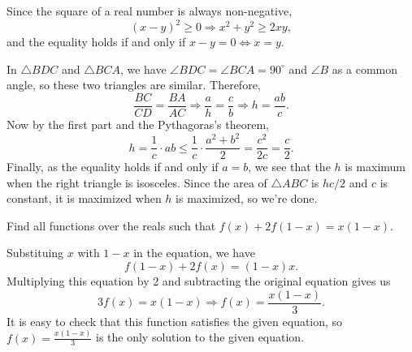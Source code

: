 \begin{solution}
    Since the square of a real number is always non-negative,
    \[ (x - y)^2 \geq 0 \Longrightarrow x^2 + y^2 \geq 2xy, \]
    and the equality holds if and only if $x - y = 0 \Longleftrightarrow x = y$.

    In $\triangle BDC$ and $\triangle BCA$, we have $\angle BDC = \angle BCA =
    90^\circ$ and $\angle B$ as a common angle, so these two triangles are
    similar. Therefore, 
    \[ \frac{BC}{CD} = \frac{BA}{AC} \Longrightarrow \frac{a}{h} = \frac{c}{b}
    \Longrightarrow h = \frac{ab}{c}. \]
    Now by the first part and the Pythagoras's theorem,
    \[ h = \frac{1}{c} \cdot ab \leq \frac{1}{c} \cdot \frac{a^2 + b^2}{2} =
    \frac{c^2}{2c} = \frac{c}{2}. \]
    Finally, as the equality holds if and only if $a = b$, we see that the $h$
    is maximum when the right triangle is isosceles. Since the area of
    $\triangle ABC$ is $hc/2$ and $c$ is constant, it is maximized when $h$ is
    maximized, so we're done.
\end{solution}

\begin{question}
    Find all functions over the reals such that $f(x) + 2f(1 - x) = x(1 - x)$.
\end{question}
\begin{solution}
    Substituing $x$ with $1 - x$ in the equation, we have
    \[ f(1 - x) + 2f(x) = (1 - x)x. \]
    Multiplying this equation by 2 and subtracting the original equation gives
    us
    \[ 3f(x) = x(1 - x) \Longrightarrow f(x) = \frac{x(1 - x)}{3}. \]
    It is easy to check that this function satisfies the given equation, so
    $f(x) = \frac{x(1 - x)}{3}$ is the only solution to the given equation.
\end{solution}

